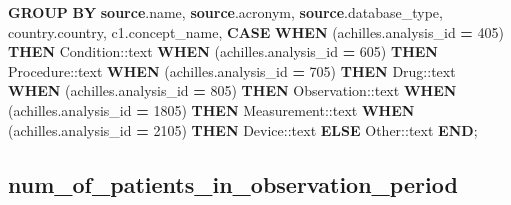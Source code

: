 \documentclass[
]{book}
\newenvironment{Shaded}{\begin{snugshade}}{\end{snugshade}}
\newcommand{\CharTok}[1]{\textcolor[rgb]{0.31,0.60,0.02}{#1}}
\newcommand{\ControlFlowTok}[1]{\textcolor[rgb]{0.13,0.29,0.53}{\textbf{#1}}}
\newcommand{\DecValTok}[1]{\textcolor[rgb]{0.00,0.00,0.81}{#1}}
\newcommand{\KeywordTok}[1]{\textcolor[rgb]{0.13,0.29,0.53}{\textbf{#1}}}
\newcommand{\NormalTok}[1]{#1}
\newcommand{\OperatorTok}[1]{\textcolor[rgb]{0.81,0.36,0.00}{\textbf{#1}}}
\newcommand{\StringTok}[1]{\textcolor[rgb]{0.31,0.60,0.02}{#1}}
\begin{document}
\begin{Shaded}
\begin{Highlighting}[]
 \KeywordTok{GROUP} \KeywordTok{BY} \KeywordTok{source}\NormalTok{.name, }\KeywordTok{source}\NormalTok{.acronym, }\KeywordTok{source}\NormalTok{.database\_type, country.country, c1.concept\_name,}
       \ControlFlowTok{CASE}
           \ControlFlowTok{WHEN}\NormalTok{ (achilles.analysis\_id }\OperatorTok{=} \DecValTok{405}\NormalTok{) }\ControlFlowTok{THEN} \StringTok{\textquotesingle{}Condition\textquotesingle{}}\NormalTok{:}\CharTok{:text}
           \ControlFlowTok{WHEN}\NormalTok{ (achilles.analysis\_id }\OperatorTok{=} \DecValTok{605}\NormalTok{) }\ControlFlowTok{THEN} \StringTok{\textquotesingle{}Procedure\textquotesingle{}}\NormalTok{:}\CharTok{:text}
           \ControlFlowTok{WHEN}\NormalTok{ (achilles.analysis\_id }\OperatorTok{=} \DecValTok{705}\NormalTok{) }\ControlFlowTok{THEN} \StringTok{\textquotesingle{}Drug\textquotesingle{}}\NormalTok{:}\CharTok{:text}
           \ControlFlowTok{WHEN}\NormalTok{ (achilles.analysis\_id }\OperatorTok{=} \DecValTok{805}\NormalTok{) }\ControlFlowTok{THEN} \StringTok{\textquotesingle{}Observation\textquotesingle{}}\NormalTok{:}\CharTok{:text}
           \ControlFlowTok{WHEN}\NormalTok{ (achilles.analysis\_id }\OperatorTok{=} \DecValTok{1805}\NormalTok{) }\ControlFlowTok{THEN} \StringTok{\textquotesingle{}Measurement\textquotesingle{}}\NormalTok{:}\CharTok{:text}
           \ControlFlowTok{WHEN}\NormalTok{ (achilles.analysis\_id }\OperatorTok{=} \DecValTok{2105}\NormalTok{) }\ControlFlowTok{THEN} \StringTok{\textquotesingle{}Device\textquotesingle{}}\NormalTok{:}\CharTok{:text}
           \ControlFlowTok{ELSE} \StringTok{\textquotesingle{}Other\textquotesingle{}}\NormalTok{:}\CharTok{:text}
       \ControlFlowTok{END}\NormalTok{;}
\end{Highlighting}
\end{Shaded}

\hypertarget{num_of_patients_in_observation_period}{%
\subsection*{num\_of\_patients\_in\_observation\_period}\label{num_of_patients_in_observation_period}}
\end{document}
